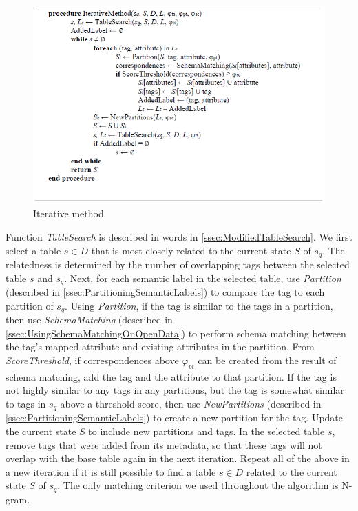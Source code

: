 \begin{figure}
  \centering
  \includegraphics[width=5in]{figures/iterative-method.png}
  \caption{Iterative method}
  \label{fig:iterative-method}
\end{figure}

Function \textit{TableSearch} is described in words in \autoref{ssec:ModifiedTableSearch}. We first select a table $s\in D$ that is most closely related to the current state $S$ of $s_q$. The relatedness is determined by the number of overlapping tags between the selected table $s$ and $s_q$. Next, for each semantic label in the selected table, use \textit{Partition} (described in \autoref{ssec:PartitioningSemanticLabels}) to compare the tag to each partition of $s_q$. Using \textit{Partition}, if the tag is similar to the tags in a partition, then use \textit{SchemaMatching} (described in \autoref{ssec:UsingSchemaMatchingOnOpenData}) to perform schema matching between the tag's mapped attribute and existing attributes in the partition. From \textit{ScoreThreshold}, if correspondences above $\ensuremath{\varphi}_{pt}$ can be created from the result of schema matching, add the tag and the attribute to that partition. If the tag is not highly similar to any tags in any partitions, but the tag is somewhat similar to tags in $s_q$ above a threshold score, then use \textit{NewPartitions} (described in \autoref{ssec:PartitioningSemanticLabels}) to create a new partition for the tag. Update the current state $S$ to include new partitions and tags. In the selected table $s$, remove tags that were added from its metadata, so that these tags will not overlap with the base table again in the next iteration. Repeat all of the above in a new iteration if it is still possible to find a table $s\in D$ related to the current state $S$ of $s_q$. The only matching criterion we used throughout the algorithm is N-gram.

